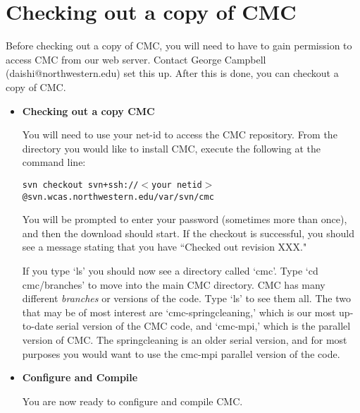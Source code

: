 \documentclass[11pt]{article}
\begin{document}




\section{Checking out a copy of CMC}
Before checking out a copy of CMC, you will need to have to gain permission to access CMC from our web server. Contact George Campbell (daishi@northwestern.edu) set this up. After this is done, you can checkout a copy of CMC.

\begin{itemize}
\item \textbf{Checking out a copy CMC}

You will need to use your net-id to access the CMC repository. From the directory you would like to install CMC, execute the following at the command line:

{\addtolength{\leftskip}{10mm} 
\texttt{svn checkout svn+ssh://$<$your netid$>$@svn.wcas.northwestern.edu/var/svn/cmc}

}

You will be prompted to enter your password (sometimes more than once), and then the download should start. If the checkout is successful, you should see a message stating that you have ``Checked out revision XXX." 

If you type `ls' you should now see a directory called `cmc'. Type `cd cmc/branches' to move into the main CMC directory. CMC has many different \emph{branches} or versions of the code. Type `ls' to see them all. The two that may be of most interest are `cmc-springcleaning,' which is our most up-to-date serial version of the CMC code, and `cmc-mpi,' which is the parallel version of CMC. The springcleaning is an older serial version, and for most purposes you would want to use the cmc-mpi parallel version of the code. %

\item \textbf{Configure and Compile}

You are now ready to configure and compile CMC. %




\end{itemize}
\end{document}
